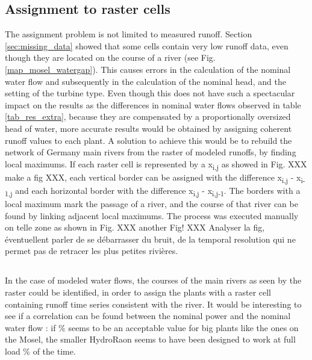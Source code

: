 \subsection{Assignment to raster cells}
\label{sub:imp_assign_cell}
The assignment problem is not limited to measured runoff. Section \ref{sec:missing_data} showed that some cells contain very low runoff data, even though they are located on the course of a river (see Fig. \ref{map_mosel_watergap}). This causes errors in the calculation of the nominal water flow and subsequently in the calculation of the nominal head, and the setting of the turbine type. Even though this does not have such a spectacular impact on the results as the differences in nominal water flows observed in table \ref{tab_res_extra}, because they are compensated by a proportionally oversized head of water, more accurate results would be obtained by assigning coherent runoff values to each plant. \newline
A solution to achieve this would be to rebuild the network of Germany main rivers from the raster of modeled runoffs, by finding local maximums. If each raster cell is represented by a x\textsubscript{i,j} as showed in Fig. XXX make a fig XXX, each vertical border can be assigned with the difference x\textsubscript{i,j} - x\textsubscript{i-1,j} and each horizontal border with the difference x\textsubscript{i,j} - x\textsubscript{i,j-1}. The borders with a local maximum mark the passage of a river, and the course of that river can be found by linking adjacent local maximums. The process was executed manually on telle zone as shown in Fig. XXX another Fig! XXX
Analyser la fig, éventuellent parler de se débarrasser du bruit, de la temporal resolution qui ne permet pas de retracer les plus petites rivières.

\subsection{}

\newline
In the case of modeled water flows, the courses of the main rivers as seen by the raster could be identified, in order to assign the plants with a raster cell containing runoff time series consistent with the river. \newline
 It would be interesting to see if a correlation can be found between the nominal power and the nominal water flow : if \unit[20]{\%} seems to be an acceptable value for big plants like the ones on the Mosel, the smaller HydroRaon seems to have been designed to work at full load \unit[30]{\%} of the time.